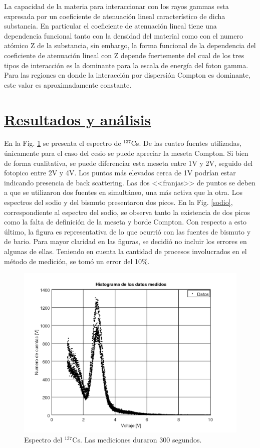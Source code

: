 \documentclass[twoside]{article}
\begin{document}
\begin{multicols}{2}
La capacidad de la materia para interaccionar con los rayos gammas esta expresada por un coeficiente de atenuación lineal característico de dicha substancia. En particular el coeficiente de atenuación lineal tiene una dependencia funcional tanto con la densidad del material como con el numero atómico Z de la substancia, sin embargo, la forma funcional de la dependencia del coeficiente de atenuación lineal con Z depende fuertemente del cual de los tres tipos de interacción es la dominante para la escala de energía del foton gamma. Para las regiones en donde la interacción por dispersión Compton es dominante, este valor es aproximadamente constante.  
\fi


\section*{\underline{Resultados y análisis}}
En la Fig. \ref{histograma} se presenta el espectro de $^{137}$Cs. De las cuatro fuentes utilizadas, únicamente para el caso del cesio se puede apreciar la meseta Compton. Si bien de forma cualitativa, se puede diferenciar esta meseta entre 1V y 2V, seguido del fotopico entre 2V y 4V. Los puntos más elevados cerca de 1V podrían estar indicando presencia de back scattering. Las dos <<franjas>> de puntos se deben a que se utilizaron dos fuentes en simultáneo, una más activa que la otra. Los espectros del sodio y del bismuto presentaron dos picos. En la Fig. \ref{sodio}, correspondiente al espectro del sodio, se observa tanto la existencia de dos picos como la falta de definición de la meseta y borde Compton. Con respecto a esto último, la figura es representativa de lo que ocurrió con las fuentes de bismuto y de bario. Para mayor claridad en las figuras, se decidió no incluir los errores en algunas de ellas. Teniendo en cuenta la cantidad de procesos involucrados en el método de medición, se tomó un error del 10\%.

\begin{figure}[H]
    \centering
    \includegraphics[scale=0.4]{espectro.png}
    \caption{Espectro del $^{137}$Cs. Las mediciones duraron 300 segundos.}
    \label{histograma}
\end{figure}


\end{multicols}
\end{document}
